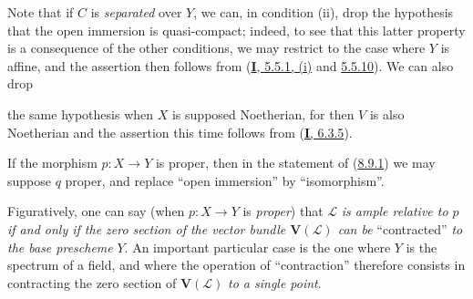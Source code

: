 Note that if $C$ is \emph{separated} over $Y$, we can, in condition
(ii), drop the hypothesis that the open immersion is quasi-compact; indeed,
to see that this latter property is a consequence of the other conditions,
we may restrict to the case where $Y$ is affine, and the assertion then
follows from (\hyperref[I.5.5.1]{\textbf{I}, 5.5.1, (i)} and
\hyperref[I.5.5.10]{5.5.10}). We can also drop

the same hypothesis when $X$ is supposed Noetherian, for then $V$ is also
Noetherian and the assertion this time follows from
(\hyperref[I.6.3.5]{\textbf{I}, 6.3.5}).

\begin{corollary}[8.9.2]
\label{II.8.9.2}
If the morphism $p:X\to Y$ is proper, then in the statement of
\textup{(\hyperref[II.8.9.1]{8.9.1})} we may suppose $q$ proper, and replace
``open immersion'' by ``isomorphism''.
\end{corollary}

Figuratively, one can say (when $p:X\to Y$ is \emph{proper}) that
$\mathcal{L}$ \emph{is ample relative to $p$ if and only if the zero section of the
vector bundle $\mathbf{V}(\mathcal{L})$ can be} ``contracted'' \emph{to the base
prescheme} $Y$. An important particular case is the one where $Y$ is the
spectrum of a field, and where the operation of ``contraction'' therefore
consists in contracting the zero section of $\mathbf{V}(\mathcal{L})$ \emph{to
a single point}.

